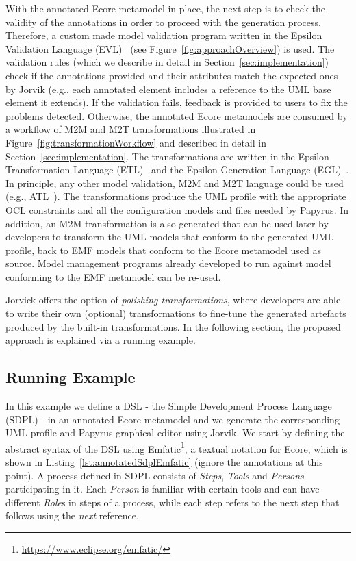 With the annotated Ecore metamodel in place, the next step is to check the validity of the annotations in order to proceed with the generation process. 
Therefore, a custom made model validation program written in the Epsilon Validation Language (EVL)~\cite{evlKolovos} (see Figure~\ref{fig:approachOverview}) is used.
The validation rules (which we describe in detail in Section~\ref{sec:implementation}) check if the annotations provided and their attributes match the expected ones by Jorvik (e.g., each annotated element includes a reference to the UML base element it extends). 
If the validation fails, feedback is provided to users to fix the problems detected. 
Otherwise, the annotated Ecore metamodels are consumed by a workflow of M2M and M2T  transformations illustrated in Figure~\ref{fig:transformationWorkflow} and described in detail in Section~\ref{sec:implementation}. 
The transformations are written in the Epsilon Transformation Language (ETL)~\cite{Kolovos2008} and the Epsilon Generation Language (EGL)~\cite{rose2008egl}. 
In principle, any other model validation, M2M and M2T language could be used (e.g., ATL~\cite{jouault2006atl}). 
The transformations produce the UML profile with the appropriate OCL constraints and all the configuration models and files needed by Papyrus. 
In addition, an M2M transformation is also generated that can be used later by developers to transform the UML models that conform to the generated UML profile, back to EMF models that conform to the Ecore metamodel used as source. 
Model management programs already developed to run against model conforming to the EMF metamodel can be re-used.

Jorvick offers the option of \textit{polishing transformations}, where developers are able to write their own (optional) transformations to fine-tune the generated artefacts produced by the built-in transformations. 
In the following section, the proposed approach is explained via a running example.

\subsection{Running Example}
\label{sec:example}
In this example we define a DSL - the Simple Development Process Language (SDPL) - in an annotated Ecore metamodel and we generate the corresponding UML profile and Papyrus graphical editor using Jorvik.
We start by defining the abstract syntax of the DSL using  Emfatic\footnote{\url{https://www.eclipse.org/emfatic/}}, a textual notation for Ecore, which is shown in Listing~\ref{lst:annotatedSdplEmfatic} (ignore the annotations at this point). 
A process defined in SDPL consists of \textit{Steps}, \textit{Tools} and \textit{Persons} participating in it. 
Each \textit{Person} is familiar with certain tools and can have different \textit{Role}s in steps of a process, while each step refers to the next step that follows using the \textit{next} reference.

